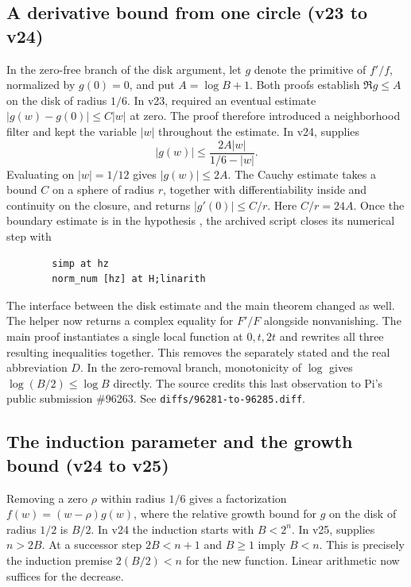\subsection{A derivative bound from one circle (v23 to v24)}

In the zero-free branch of the disk argument, let \(g\) denote the
primitive of \(f'/f\), normalized by \(g(0)=0\), and put
\(A=\log B+1\). Both proofs establish \(\Re g\leq A\) on the disk of
radius \(1/6\). In v23,  required an
eventual estimate \(|g(w)-g(0)|\leq C|w|\) at zero. The proof therefore
introduced a neighborhood filter and kept the variable \(|w|\) throughout
the estimate. In v24,  supplies
\[
 |g(w)|\leq \frac{2A|w|}{1/6-|w|}.
\]
Evaluating on \(|w|=1/12\) gives \(|g(w)|\leq 2A\).
The Cauchy estimate
 takes a bound
\(C\) on a sphere of radius \(r\), together with differentiability inside
and continuity on the closure, and returns \(|g'(0)|\leq C/r\).
Here \(C/r=24A\). Once the boundary estimate is in the hypothesis
, the archived script closes its numerical step with
\begin{verbatim}
        simp at hz
        norm_num [hz] at H;linarith
\end{verbatim}

The interface between the disk estimate and the main theorem changed
as well. The helper  now returns a complex equality for \(F'/F\)
alongside nonvanishing. The main proof instantiates a single local
function at \(0,t,2t\) and rewrites all three resulting inequalities
together. This removes the separately stated  and the
real abbreviation \(D\). In the zero-removal branch, monotonicity of
\(\log\) gives \(\log(B/2)\leq\log B\) directly. The source credits
this last observation to Pi's public submission \#96263.
See \texttt{diffs/96281-to-96285.diff}.

\subsection{The induction parameter and the growth bound (v24 to v25)}

Removing a zero \(\rho\) within radius \(1/6\) gives a factorization
\(f(w)=(w-\rho)g(w)\), where the relative growth bound for \(g\) on
the disk of radius \(1/2\) is \(B/2\). In v24 the induction starts with
\(B<2^n\). In v25,  supplies \(n>2B\).
At a successor step \(2B<n+1\) and \(B\geq 1\) imply \(B<n\).
This is precisely the induction premise \(2(B/2)<n\) for the new
function. Linear arithmetic now suffices for the decrease.

